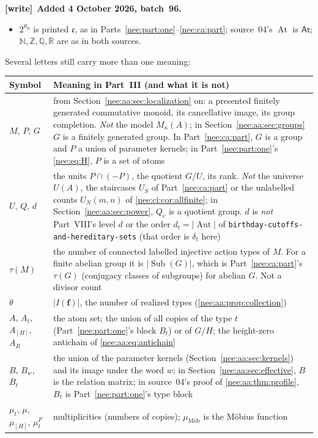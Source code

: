 \documentclass[11pt,letterpaper]{article}
\numberwithin{equation}{section}
\theoremstyle{plain}
\theoremstyle{definition}
\theoremstyle{remark}
\newcommand{\At}{\mathsf{At}}
\newcommand{\cont}{\mathfrak c}
\newcommand{\Mk}{M_\kappa(A)}
\newcommand{\Sub}{\operatorname{Sub}}
\newcommand{\Aut}{\operatorname{Aut}}
\newenvironment{writenote}[1][]{\par\smallskip\begingroup\small\raggedright
 \setlength{\parindent}{1.25em}\noindent\textbf{[write]}\if\relax\detokenize{#1}\relax\else~\textbf{#1.}\fi\ }%
 {\par\endgroup\smallskip}
\begin{document}
\begin{writenote}[Added 4 October 2026, batch~96]
\begin{itemize}
\item $2^{\aleph_0}$ is printed $\cont$, as in Parts~\ref{nee:part:one}--\ref{nee:ca:part}; source~04's $\operatorname{At}$ is $\At$; $\mathbb N,\mathbb Z,\mathbb Q,\mathbb R$ are as in both sources.
\end{itemize}
Several letters still carry more than one meaning:
\begin{center}\small
\begin{tabular}{>{\raggedright\arraybackslash}p{}>{\raggedright\arraybackslash}p{}}
\toprule
Symbol & Meaning in Part~III (and what it is not)\\
\midrule
$M$, $P$, $G$ & from Section~\ref{nee:aa:sec:localization} on: a presented finitely generated commutative monoid, its cancellative image, its group completion. \emph{Not} the model $\Mk$; in Section~\ref{nee:aa:sec:groups} $G$ is a finitely generated group. In Part~\ref{nee:ca:part}, $G$ is a group and $P$ a union of parameter kernels; in Part~\ref{nee:part:one}'s \eqref{nee:eq:H}, $P$ is a set of atoms\\
$U$, $Q$, $d$ & the units $P\cap(-P)$, the quotient $G/U$, its rank. \emph{Not} the universe $U(A)$, the staircases $U_S$ of Part~\ref{nee:ca:part} or the unlabelled counts $U_N(m,n)$ of \cref{nee:ci:cor:allfinite}; in Section~\ref{nee:aa:sec:power}, $Q_e$ is a quotient group. $d$ is \emph{not} Part~VIII's level $d$ or the order $d_t=|\Aut|$ of \nolinkurl{birthday-cutoffs-and-hereditary-sets} (that order is $\delta_t$ here)\\
$\tau(M)$ & the number of connected labelled injective action types of $M$. For a finite abelian group it is $|\Sub(G)|$, which is Part~\ref{nee:ca:part}'s $\tau(G)$ (conjugacy classes of subgroups) for abelian $G$. Not a divisor count\\
$\theta$ & $|I(\boldsymbol f)|$, the number of realized types (\cref{nee:aa:prop:collection})\\
$A$, $A_t$, $A_{[H]}$, $A_R$ & the atom set; the union of all copies of the type $t$ (Part~\ref{nee:part:one}'s block $B_t$) or of $G/H$; the height-zero antichain of \eqref{nee:aa:eq:antichain}\\
$B$, $B_w$, $B_t$ & the union of the parameter kernels (Section~\ref{nee:aa:sec:kernels}) and its image under the word $w$; in Section~\ref{nee:aa:sec:effective}, $B$ is the relation matrix; in source~04's proof of \cref{nee:aa:thm:profile}, $B_t$ is Part~\ref{nee:part:one}'s type block\\
$\mu_t$, $\mu$, $\mu_{[H]}$, $\mu^F_t$ & multiplicities (numbers of copies); $\mu_{\text{M\"ob}}$ is the M\"obius function\\

\end{tabular}
\end{center}
\end{writenote}
\end{document}
